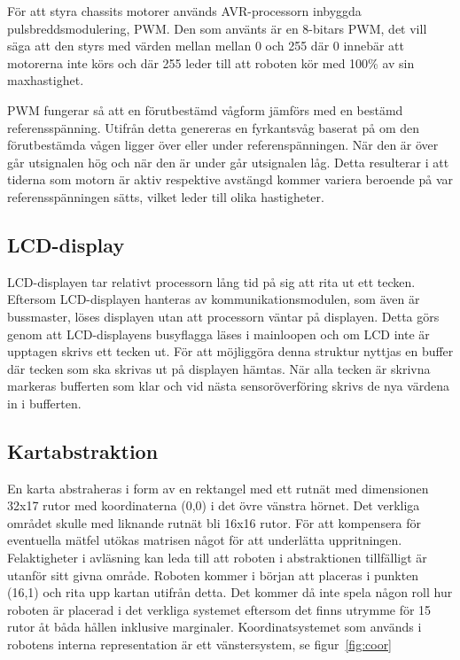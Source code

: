 \documentclass[a4paper,12pt,fleqn]{article}
\begin{document}
För att styra chassits motorer används AVR-processorn inbyggda pulsbreddsmodulering, PWM. Den som använts är en 8-bitars PWM, det vill säga att den styrs med värden mellan mellan 0 och 255 där 0 innebär att motorerna inte körs och där 255 leder till att roboten kör med 100\% av sin maxhastighet.

PWM fungerar så att en förutbestämd vågform jämförs med en bestämd referensspänning. Utifrån detta genereras en fyrkantsvåg baserat på om den förutbestämda vågen ligger över eller under referenspänningen. När den är över går utsignalen hög och när den är under går utsignalen låg. Detta resulterar i att tiderna som motorn är aktiv respektive avstängd kommer variera beroende på var referensspänningen sätts, vilket leder till olika hastigheter.


\subsection{LCD-display}
LCD-displayen tar relativt processorn lång tid på sig att rita ut ett tecken. Eftersom LCD-displayen hanteras av kommunikationsmodulen, som även är bussmaster, löses displayen utan att processorn väntar på displayen. Detta görs genom att LCD-displayens busyflagga läses i mainloopen och om LCD inte är upptagen skrivs ett tecken ut. För att möjliggöra denna struktur nyttjas en buffer där tecken som ska skrivas ut på displayen hämtas. När alla tecken är skrivna markeras bufferten som klar och vid nästa sensoröverföring skrivs de nya värdena in i bufferten. 

\subsection{Kartabstraktion}


En karta abstraheras i form av en rektangel med ett rutnät med dimensionen 32x17 rutor med koordinaterna (0,0) i det övre vänstra hörnet. Det verkliga området skulle med liknande rutnät bli 16x16 rutor. För att kompensera för eventuella mätfel utökas matrisen något för att underlätta uppritningen. Felaktigheter i avläsning kan leda till att roboten i abstraktionen tillfälligt är utanför sitt givna område. Roboten kommer i början att placeras i punkten (16,1) och rita upp kartan utifrån detta. Det kommer då inte spela någon roll hur roboten är placerad i det verkliga systemet eftersom det finns utrymme för 15 rutor åt båda hållen inklusive marginaler. Koordinatsystemet som används i robotens interna representation är ett vänstersystem, se figur~\ref{fig:coor}
\end{document}

